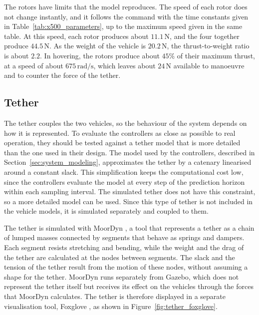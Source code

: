The rotors have limits that the model reproduces. The speed of each rotor does not change instantly, and it follows the command with the time constants given in Table~\ref{tab:x500_parameters}, up to the maximum speed given in the same table. At this speed, each rotor produces about $11.1\,\text{N}$, and the four together produce $44.5\,\text{N}$. As the weight of the vehicle is $20.2\,\text{N}$, the thrust-to-weight ratio is about $2.2$. In hovering, the rotors produce about $45\%$ of their maximum thrust, at a speed of about $675\,\text{rad/s}$, which leaves about $24\,\text{N}$ available to manoeuvre and to counter the force of the tether.

\subsection{Tether}
\label{sec:tether}

The tether couples the two vehicles, so the behaviour of the system depends on how it is represented. To evaluate the controllers as close as possible to real operation, they should be tested against a tether model that is more detailed than the one used in their design. The model used by the controllers, described in Section~\ref{sec:system_modeling}, approximates the tether by a catenary linearised around a constant slack. This simplification keeps the computational cost low, since the controllers evaluate the model at every step of the prediction horizon within each sampling interval. The simulated tether does not have this constraint, so a more detailed model can be used. Since this type of tether is not included in the vehicle models, it is simulated separately and coupled to them.

The tether is simulated with MoorDyn \cite{hall2015moordyn}, a tool that represents a tether as a chain of lumped masses connected by segments that behave as springs and dampers. Each segment resists stretching and bending, while the weight and the drag of the tether are calculated at the nodes between segments. The slack and the tension of the tether result from the motion of these nodes, without assuming a shape for the tether. MoorDyn runs separately from Gazebo, which does not represent the tether itself but receives its effect on the vehicles through the forces that MoorDyn calculates. The tether is therefore displayed in a separate visualisation tool, Foxglove \cite{foxglove}, as shown in Figure~\ref{fig:tether_foxglove}.

